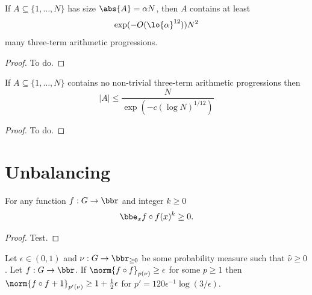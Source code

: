 \begin{theorem}\label{main-int-count}
If $A\subseteq \{1,\ldots,N\}$ has size $\abs{A}=\alpha N$, then $A$ contains at least
\[\exp(-O(\lo{\alpha}^{12}))N^2\]
many three-term arithmetic progressions.
\end{theorem}
\begin{proof}
To do.
\end{proof}

\begin{theorem}
  \label{int}
  \uses{}
  \leanok
  If $A\subseteq \{1,\ldots,N\}$ contains no non-trivial three-term arithmetic progressions then
  \[\lvert A\rvert \leq \frac{N}{\exp(-c(\log N)^{1/12})}\]
\end{theorem}
\begin{proof}
  To do.
\end{proof}












\chapter{Unbalancing}

\begin{lemma}
\label{nonneg_moments}
\leanok
For any function $f:G\to\bbr$ and integer $k\geq 0$
\[\bbe_x f\circ f(x)^k\geq 0.\]
\end{lemma}
\begin{proof}
\leanok
Test.
\end{proof}

\begin{lemma}
\label{unbalancing}
\leanok
Let $\epsilon\in(0,1)$ and $\nu:G\to\bbr_{\geq 0}$ be some probability measure such that $\widehat{\nu}\geq 0$. Let $f:G\to\bbr$. If $\norm{f\circ f}_{p(\nu)}\geq \epsilon$ for some $p\geq 1$ then $\norm{f\circ f+1}_{p'(\nu)}\geq 1+\tfrac{1}{2}\epsilon$ for $p'=120\epsilon^{-1}\log(3/\epsilon)$.
\end{lemma}

